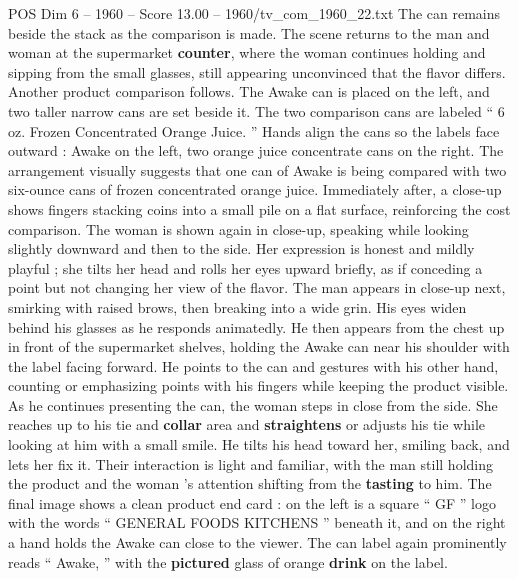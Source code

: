 \begin{textsample}{POS Dim 6 – 1960 – Score 13.00 – 1960/tv\_com\_1960\_22.txt}
The can remains beside the stack as the comparison is made.
The scene returns to the man and woman at the supermarket \textbf{counter}, where the woman continues holding and sipping from the small glasses, still appearing unconvinced that the flavor differs.
Another product comparison follows.
The Awake can is placed on the left, and two taller narrow cans are set beside it.
The two comparison cans are labeled “ 6 oz.
Frozen Concentrated Orange Juice. ” Hands align the cans so the labels face outward : Awake on the left, two orange juice concentrate cans on the right.
The arrangement visually suggests that one can of Awake is being compared with two six-ounce cans of frozen concentrated orange juice.
Immediately after, a close-up shows fingers stacking coins into a small pile on a flat surface, reinforcing the cost comparison.
The woman is shown again in close-up, speaking while looking slightly downward and then to the side.
Her expression is honest and mildly playful ; she tilts her head and rolls her eyes upward briefly, as if conceding a point but not changing her view of the flavor.
The man appears in close-up next, smirking with raised brows, then breaking into a wide grin.
His eyes widen behind his glasses as he responds animatedly.
He then appears from the chest up in front of the supermarket shelves, holding the Awake can near his shoulder with the label facing forward.
He points to the can and gestures with his other hand, counting or emphasizing points with his fingers while keeping the product visible.
As he continues presenting the can, the woman steps in close from the side.
She reaches up to his tie and \textbf{collar} area and \textbf{straightens} or adjusts his tie while looking at him with a small smile.
He tilts his head toward her, smiling back, and lets her fix it.
Their interaction is light and familiar, with the man still holding the product and the woman ’s attention shifting from the \textbf{tasting} to him.
The final image shows a clean product end card : on the left is a square “ GF ” logo with the words “ GENERAL FOODS KITCHENS ” beneath it, and on the right a hand holds the Awake can close to the viewer.
The can label again prominently reads “ Awake, ” with the \textbf{pictured} glass of orange \textbf{drink} on the label.

\end{textsample}
